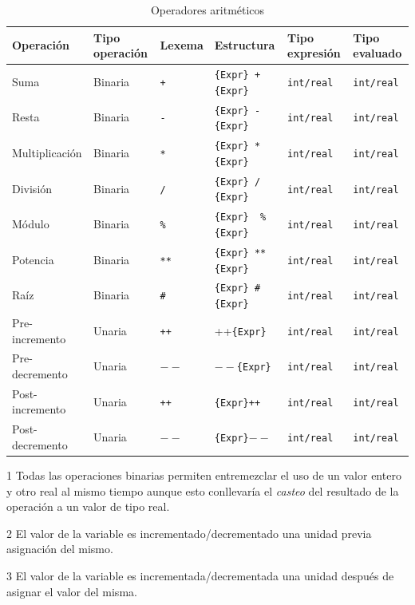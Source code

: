 \documentclass[11pt, english]{article}
\begin{document}
\begin{table}[H]
	\begin{center}
		\caption{Operadores aritméticos}\label{tab:arithmetic}
		\begin{threeparttable}
			\begin{tabular}{l|l|l|l|l|l}
				\toprule
				\textbf{Operación} & \textbf{Tipo operación} & \textbf{Lexema} & \textbf{Estructura} & \textbf{Tipo expresión} & \textbf{Tipo evaluado} \tnote{1}\\
				\midrule
				Suma  & Binaria & \texttt{+} & \texttt{\{Expr\} + \{Expr\}} & \texttt{int/real} & \texttt{int/real}\\
				Resta & Binaria & \texttt{-} & \texttt{\{Expr\} - \{Expr\}} & \texttt{int/real} & \texttt{int/real}\\
				Multiplicación & Binaria & \texttt{*} & \texttt{\{Expr\} * \{Expr\}} & \texttt{int/real} & \texttt{int/real}\\
				División & Binaria & \texttt{/} & \texttt{\{Expr\} / \{Expr\}} & \texttt{int/real} & \texttt{int/real}\\
				Módulo & Binaria & \texttt{\%} & \texttt{\{Expr\}\, \% \{Expr\}} & \texttt{int/real} & \texttt{int/real}\\
				Potencia & Binaria & \texttt{**} & \texttt{\{Expr\} ** \{Expr\}} & \texttt{int/real} & \texttt{int/real}\\
				Raíz & Binaria & \texttt{\#} & \texttt{\{Expr\} \# \{Expr\}} & \texttt{int/real} & \texttt{int/real}\\
				Pre-incremento \tnote{2} & Unaria & \texttt{++} & ++\texttt{\{Expr\}} & \texttt{int/real} & \texttt{int/real}\\
				Pre-decremento \tnote{2} & Unaria & \texttt{$--$} & $--$\texttt{\{Expr\}} & \texttt{int/real} & \texttt{int/real}\\
				Post-incremento \tnote{3} & Unaria & \texttt{++} & \texttt{\{Expr\}++} & \texttt{int/real} & \texttt{int/real}\\
				Post-decremento \tnote{3} & Unaria & \texttt{$--$} & \texttt{\{Expr\}$--$} & \texttt{int/real} & \texttt{int/real}\\
				\bottomrule
			\end{tabular}
			\begin{tablenotes}
				\small
				\item[1] Todas las operaciones binarias permiten entremezclar el uso de un valor entero y otro real al mismo tiempo aunque esto conllevaría el \textit{casteo} del resultado de la operación a un valor de tipo real.
				\item [2] El valor de la variable es incrementado/decrementado una unidad previa asignación del mismo.
				\item[3] El valor de la variable es incrementada/decrementada una unidad después de asignar el valor del misma.
			\end{tablenotes}
		\end{threeparttable}
	\end{center}
\end{table}
\end{document}
